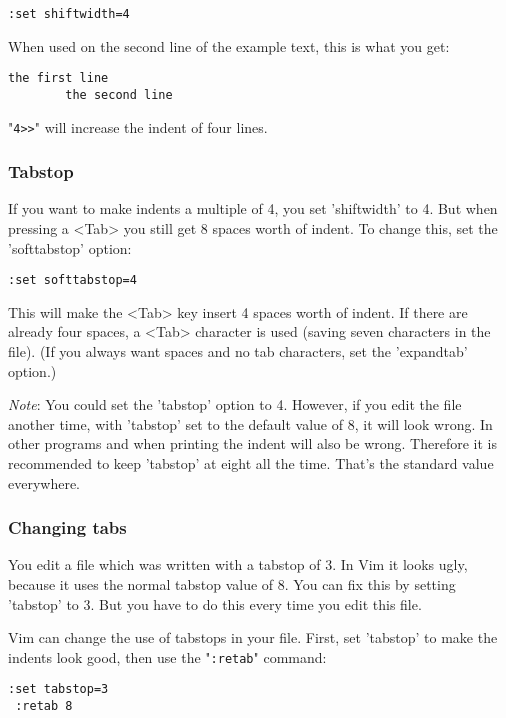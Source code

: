 \begin{Verbatim}[samepage=true]
 :set shiftwidth=4
\end{Verbatim}

When used on the second line of the example text, this is what you get:

\begin{Verbatim}[samepage=true]
    the first line 
        the second line 
\end{Verbatim}

"\verb!4>>!" will increase the indent of four lines.
\subsubsection{Tabstop}
If you want to make indents a multiple of 4, you set 'shiftwidth' to 4.
But when pressing a <Tab> you still get 8 spaces worth of indent.
To change this, set the 'softtabstop' option:

\begin{Verbatim}[samepage=true]
 :set softtabstop=4
\end{Verbatim}

This will make the <Tab> key insert 4 spaces worth of indent.
If there are already four spaces, a <Tab> character is used (saving seven characters in the file).
(If you always want spaces and no tab characters, set the 'expandtab' option.)

\emph{Note}: You could set the 'tabstop' option to 4.
However, if you edit the file another time, with 'tabstop' set to the default value of 8, it will look wrong.
In other programs and when printing the indent will also be wrong.
Therefore it is recommended to keep 'tabstop' at eight all the time.
That's the standard value everywhere.

\subsubsection{Changing tabs}
You edit a file which was written with a tabstop of 3.
In Vim it looks ugly, because it uses the normal tabstop value of 8.
You can fix this by setting 'tabstop' to 3.
But you have to do this every time you edit this file.

Vim can change the use of tabstops in your file.
First, set 'tabstop' to make the indents look good, then use the "\verb!:retab!" command:

\begin{Verbatim}[samepage=true]
 :set tabstop=3
 :retab 8
\end{Verbatim}

